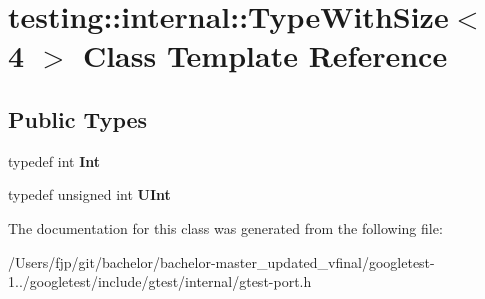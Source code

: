 \hypertarget{classtesting_1_1internal_1_1_type_with_size_3_014_01_4}{}\section{testing\+:\+:internal\+:\+:Type\+With\+Size$<$ 4 $>$ Class Template Reference}
\label{classtesting_1_1internal_1_1_type_with_size_3_014_01_4}
\subsection*{Public Types}
\begin{DoxyCompactItemize}
\item 
\mbox{\label{classtesting_1_1internal_1_1_type_with_size_3_014_01_4_a80351860c00ed665e73f952143f4484a}} 
typedef int {\bfseries Int}
\item 
\mbox{\label{classtesting_1_1internal_1_1_type_with_size_3_014_01_4_a7d559570f830bf35d095eeb94d98de58}} 
typedef unsigned int {\bfseries U\+Int}
\end{DoxyCompactItemize}


The documentation for this class was generated from the following file\+:\begin{DoxyCompactItemize}
\item 
/\+Users/fjp/git/bachelor/bachelor-\/master\+\_\+updated\+\_\+vfinal/googletest-\/1../googletest/include/gtest/internal/gtest-\/port.\+h\end{DoxyCompactItemize}
